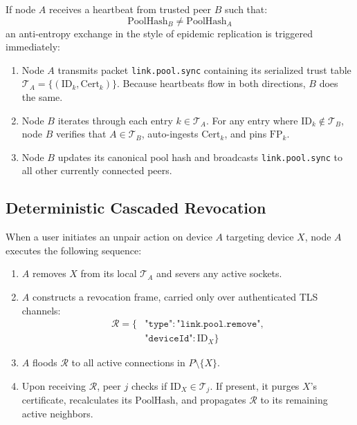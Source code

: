 \documentclass[conference,a4paper]{IEEEtran}
\begin{document}
If node $A$ receives a heartbeat from trusted peer $B$ such that:
\begin{equation}
    \text{PoolHash}_B \neq \text{PoolHash}_A
\end{equation}
an anti-entropy exchange in the style of epidemic replication \cite{demers1987epidemic} is triggered immediately:
\begin{enumerate}
    \item Node $A$ transmits packet \texttt{link.pool.sync} containing its serialized trust table $\mathcal{T}_A = \{ (\text{ID}_k, \text{Cert}_k) \}$. Because heartbeats flow in both directions, $B$ does the same.
    \item Node $B$ iterates through each entry $k \in \mathcal{T}_A$. For any entry where $\text{ID}_k \notin \mathcal{T}_B$, node $B$ verifies that $A \in \mathcal{T}_B$, auto-ingests $\text{Cert}_k$, and pins $\text{FP}_k$.
    \item Node $B$ updates its canonical pool hash and broadcasts \texttt{link.pool.sync} to all other currently connected peers.
\end{enumerate}

\subsection{Deterministic Cascaded Revocation}
When a user initiates an unpair action on device $A$ targeting device $X$, node $A$ executes the following sequence:
\begin{enumerate}
    \item $A$ removes $X$ from its local $\mathcal{T}_A$ and severs any active sockets.
    \item $A$ constructs a revocation frame, carried only over authenticated TLS channels:
    \begin{equation}
    \begin{split}
        \mathcal{R} = \big\{&\texttt{"type"}: \texttt{"link.pool.remove"}, \\
        &\texttt{"deviceId"}: \text{ID}_X\big\}
    \end{split}
    \end{equation}
    \item $A$ floods $\mathcal{R}$ to all active connections in $P \setminus \{X\}$.
    \item Upon receiving $\mathcal{R}$, peer $j$ checks if $\text{ID}_X \in \mathcal{T}_j$. If present, it purges $X$'s certificate, recalculates its $\text{PoolHash}$, and propagates $\mathcal{R}$ to its remaining active neighbors.
\end{enumerate}
\end{document}

